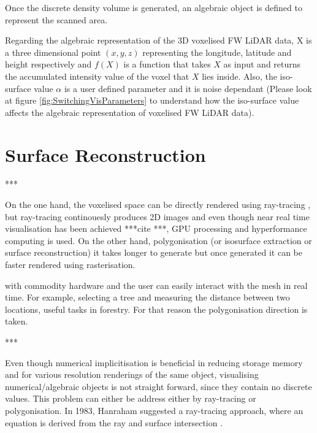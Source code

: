 \documentclass{subfiles}
\begin{document}
\par Once the discrete density volume is generated, an algebraic object is defined to represent the scanned area. 

\par Regarding the algebraic representation of the 3D voxelised FW LiDAR data, X is a three dimensional point $\mathit{(x, y, z) }$ representing the longitude, latitude and height respectively and ${f(X)}$ is a function that takes  $\mathit{X}$ as input and returns the accumulated intensity value of the voxel that  $\mathit{X}$ lies inside. Also, the iso-surface value $\mathit{\alpha }$ is a user defined parameter and it is noise dependant (Please look at figure \ref{fig:SwitchingVisParameters} to understand how the iso-surface value affects the algebraic representation of voxelised FW LiDAR data). 




\section {Surface Reconstruction}\label{sec:SurfaceReconstruction}

*** 

On the one hand, the voxelised space can be directly rendered using ray-tracing \cite{Hanrahan1983}, but ray-tracing continouesly produces 2D images and even though near real time visualisation has been achieved ***cite ***, GPU processing and hyperformance computing is used. On the other hand, polygonisation (or isosurface extraction or surface reconstruction) it takes longer to generate but once generated it can be faster rendered using rasterisation. 

with commodity hardware and the user can easily interact with the mesh in real time. For example, selecting a tree and measuring the distance between two locations, useful tasks in forestry. For that reason the polygonisation direction is taken. 

***

\par Even though numerical implicitisation is beneficial in reducing storage memory and for various resolution renderings of the same object, visualising numerical/algebraic objects is not straight forward, since they contain no discrete values. This problem can either be address either by ray-tracing or polygonisation. In 1983, Hanraham suggested a ray-tracing approach, where an equation is derived from the ray and surface intersection \cite{Hanrahan1983}.  
\end{document}
